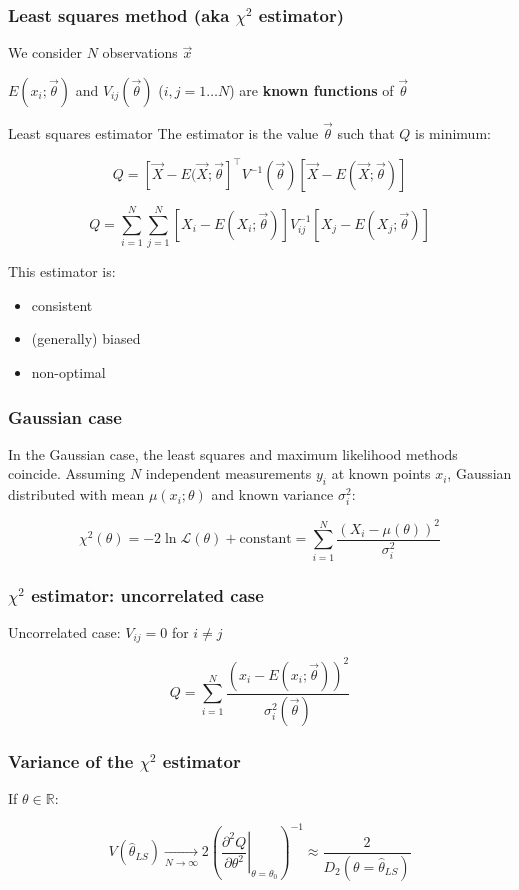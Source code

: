 \documentclass[9pt]{beamer}
\begin{document}
\begin{frame}
 \frametitle{Least squares method (aka $\chi^2$ estimator)}
 
 We consider $N$ observations $\vec{x}$
 
 $E(x_i;\vec{\theta})$ and $V_{ij}(\vec{\theta})$ ($i,j = 1\dots N$) are \textbf{known functions} of $\vec{\theta}$
 
 \begin{block}{Least squares estimator}
 The estimator is the value $\vec{\theta}$ such that $Q$ is minimum:
 
  $$Q = \left[ \vec{X} - E(\vec{X};\vec{\theta}\right]^\intercal V^{-1} (\vec{\theta}) \left[ \vec{X} - E(\vec{X};\vec{\theta}) \right]$$
  
  $$Q = \sum_{i=1}^N \sum_{j=1}^N \left[ X_i - E(X_i;\vec{\theta})\right] V^{-1}_{ij} \left[ X_j - E(X_j;\vec{\theta})\right]$$
 \end{block}
 
 This estimator is:
 
 \begin{itemize}
  \item consistent
  \item (generally) biased
  \item non-optimal
 \end{itemize}


\end{frame}

\begin{frame}
 \frametitle{Gaussian case}
 
 In the Gaussian case, the least squares and maximum likelihood methods coincide. Assuming $N$ independent measurements $y_i$ at known points $x_i$, Gaussian distributed with mean
 $\mu(x_i;\theta)$ and known variance $\sigma_i^2$:
 
 $$\chi^2(\theta) = -2\ln\mathcal{L}(\theta) + \text{constant} = \sum_{i=1}^N \frac{\left(X_i - \mu(\theta)\right)^2}{\sigma_i^2}$$
\end{frame}


\begin{frame}
 \frametitle{$\chi^2$ estimator: uncorrelated case}
 
 Uncorrelated case: $V_{ij} = 0 $ for $i \neq j$
 
 $$Q = \sum_{i=1}^N \frac{\left(x_i - E(x_i; \vec{\theta})\right)^2}{\sigma_i^2(\vec{\theta})}$$
\end{frame}

\begin{frame}
 \frametitle{Variance of the $\chi^2$ estimator}
 
 If $\theta \in \mathbb{R}$:
 
 $$V(\hat{\theta}_{LS}) \xrightarrow[N\to\infty]{} 2\left(\left.\frac{\partial^2 Q}{\partial\theta^2}\right|_{\theta=\theta_0}\right)^{-1} \approx \frac{2}{D_2(\theta=\hat{\theta}_{LS})}$$
\end{frame}
\end{document}
